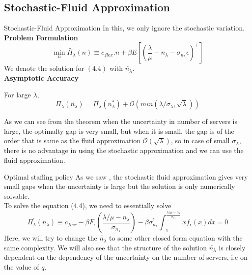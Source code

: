 \documentclass[8pt]{beamer}
\begin{document}
\subsection{Stochastic-Fluid Approximation}
\begin{frame}{Stochastic-Fluid Approximation}
    In this, we only ignore the stochastic variation.
    \\ \textbf{Problem Formulation}\\ 
   \begin{equation}
    \min_{n} \tilde{{\Pi}_{\lambda}}({n}) \equiv c_{flex}.n+\beta E[(\frac{\lambda}{\mu}-n_\lambda-\sigma_{n_\lambda}\epsilon)^{+}]
\end{equation}
We denote the solution for $(4.4)$ with $\tilde{n_\lambda}$.
\\ \medskip \textbf{Asymptotic Accuracy} \\
 \begin{theorem}
For large $\lambda$,
$$\Pi_\lambda(\tilde{n_\lambda})=\Pi_\lambda(n_\lambda^{*})+\mathcal{O}(min(\lambda/\sigma_\lambda,\sqrt{\lambda}))$$
\end{theorem}
As we can see from the theorem when the uncertainty in number of servers is large, the optimalty gap is very small, but when it is small, the gap is of the order that is same as the fluid approximation $\mathcal{O}(\sqrt{\lambda})$, so in case of small $\sigma_{\lambda}$, there is no advantage in using the stochastic approximation and we can use the fluid approximation.
\end{frame}
\begin{frame}{Optimal staffing policy}
    As we saw , the stochastic fluid approximation gives very small gaps when the uncertainty is large but the solution is only numerically solvable. 
\\ To solve the equation (4.4), we need to essentially solve
\begin{equation}
    \Pi_\lambda^{'}(n_\lambda) \equiv c_{flex}-\beta F_{\epsilon}(\frac{\lambda/\mu-n_{\lambda}}{\sigma_{n_{\lambda}}})-\beta\sigma^{'}_{n_{\lambda}}\int_{-1}^{\frac{\lambda/\mu-n_{\lambda}}{\sigma_{n_{\lambda}}}}xf_{\epsilon}(x)dx=0
\end{equation}
Here, we will try to change the $\tilde{n_\lambda}$ to some other closed form equation with the same complexity. We will also see that the structure of the solution $\tilde{n_\lambda}$ is closely dependent on the dependency of the uncertainty on the number of servers, i.e on the value of $q$. 
\end{frame}
\end{document}
